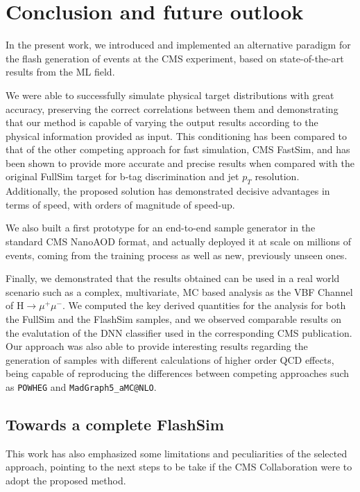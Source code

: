 \chapter{Conclusion and future outlook}\label{ch:outlook} %
In the present work, we introduced and implemented an alternative paradigm for the flash generation of events at the CMS experiment, based on state-of-the-art results from the ML field.

We were able to successfully simulate physical target distributions with great accuracy, preserving the correct correlations between them and demonstrating that our method is capable of varying the output results according to the physical information provided as input. This conditioning has been compared to that of the other competing approach for fast simulation, CMS FastSim, and has been shown to provide more accurate and precise results when compared with the original FullSim target for b-tag discrimination and jet $p_T$ resolution. Additionally, the proposed solution has demonstrated decisive advantages in terms of speed, with orders of magnitude of speed-up.

We also built a first prototype for an end-to-end sample generator in the standard CMS NanoAOD format, and actually deployed it at scale on millions of events, coming from the training process as well as new, previously unseen ones. 

Finally, we demonstrated that the results obtained can be used in a real world scenario such as a complex, multivariate, MC based analysis as the VBF Channel of H$\rightarrow\mu^+\mu^-$. We computed the key derived quantities for the analysis for both the FullSim and the FlashSim samples, and we observed comparable results on the evalutation of the DNN classifier used in the corresponding CMS publication.
Our approach was also able to provide interesting results regarding the generation of samples with different calculations of higher order QCD effects, being capable of reproducing the differences between competing approaches such as \texttt{POWHEG} and \texttt{MadGraph5\_aMC@NLO}.

\section{Towards a complete FlashSim}
This work has also emphasized some limitations and peculiarities of the selected approach, pointing to the next steps to be take if the CMS Collaboration were to adopt the proposed method.

